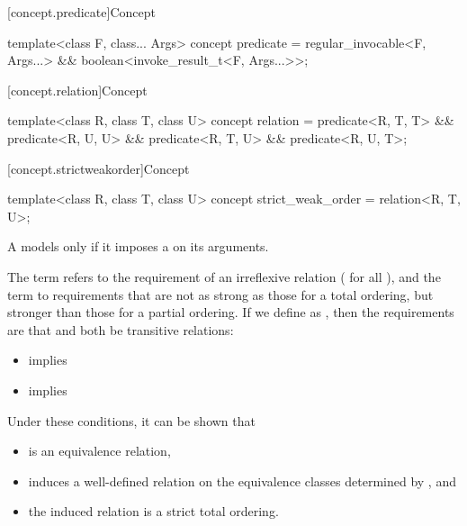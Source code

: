 [concept.predicate]{Concept }

%
\begin{itemdecl}
template<class F, class... Args>
  concept predicate = regular_invocable<F, Args...> && boolean<invoke_result_t<F, Args...>>;
\end{itemdecl}

[concept.relation]{Concept }

%
\begin{itemdecl}
template<class R, class T, class U>
  concept relation =
    predicate<R, T, T> && predicate<R, U, U> &&
    predicate<R, T, U> && predicate<R, U, T>;
\end{itemdecl}

[concept.strictweakorder]{Concept }

%
\begin{itemdecl}
template<class R, class T, class U>
  concept strict_weak_order = relation<R, T, U>;
\end{itemdecl}

\begin{itemdescr}
\pnum
A  models  only if
it imposes a  on its arguments.

\pnum
The term
refers to the
requirement of an irreflexive relation ( for all ),
and the term
to requirements that are not as strong as
those for a total ordering,
but stronger than those for a partial
ordering.
If we define
as
,
then the requirements are that
and
both be transitive relations:

\begin{itemize}
\item
{}
implies
\item
{}
implies
\end{itemize}

\pnum
\begin{note}
Under these conditions, it can be shown that
\begin{itemize}
\item
{}
is an equivalence relation,
\item
{}
induces a well-defined relation on the equivalence
classes determined by
, and
\item
the induced relation is a strict total ordering.
\end{itemize}
\end{note}
\end{itemdescr}
